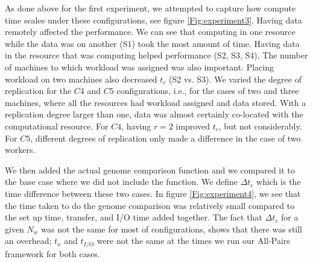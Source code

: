 \documentclass{rspublic}
\begin{document}
As done above for the first experiment, we attempted to capture how
compute time scales under these configurations, see figure
\ref{Fig:experiment3}. Having data remotely affected the performance. We
can see that computing in one resource while the data was on another
(S1) took the most amount of time. Having data in the resource that was
computing helped performance (S2, S3, S4). The number of machines to
which workload was assigned was also important. Placing workload on two
machines also decreased $t_c$ (S2 vs. S3). We varied the degree of
replication for the $C4$ and $C5$ configurations, i.e., for the cases of
two and three machines, where all the resources had workload assigned
and data stored. With a replication degree larger than one, data was
almost certainly co-located with the computational resource. For $C4$, having $r = 2$ improved $t_c$, but not
considerably. For $C5$, different degrees of replication only made a
difference in the case of two workers.

We then added the actual genome comparison function and we compared it
to the base case where we did not include the function. We define $\Delta t_c$
which is the time difference between these two cases. In figure
\ref{Fig:experiment4}, we see that the time taken to do the genome
comparison was relatively small compared to the set up time, transfer,
and I/O time added together. The fact that $\Delta t_c$ for a given
$N_w$ was not the same for most of configurations, shows that there was
still an overhead; $t_x$ and $t_{I/O}$ were not the same at the
times we run our All-Pairs framework for both cases.
\end{document}
